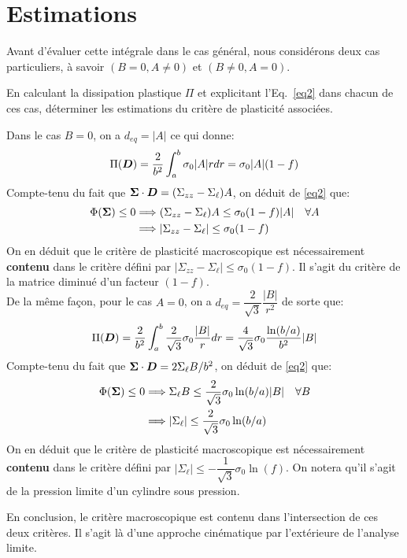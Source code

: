 \documentclass[french,12pt]{exam}
\begin{document}
\section{Estimations}
Avant d'évaluer cette intégrale dans le cas général, nous considérons deux cas particuliers, à savoir $(B = 0, A \neq 0)$ et  $(B \neq 0, A = 0)$.\\

\begin{questions}
\question En calculant la dissipation plastique $\Pi$ et explicitant l'Eq.~\ref{eq2} dans chacun de ces cas, déterminer les estimations du critère de plasticité associées.
\begin{solution}
Dans le cas $B=0$, on a $d_{eq}=|A|$ ce qui donne:
$$ \Pi(\boldsymbol{D}) = \frac{2}{b^2} \int_a^b \sigma_0 |A| rdr = \sigma_0 |A|(1-f)$$
Compte-tenu du fait que $\boldsymbol{\Sigma} \cdot \boldsymbol{D} = (\Sigma_{zz}-\Sigma_\ell)A$, on déduit de \eqref{eq2} que:
\begin{align*}
\Phi(\boldsymbol{\Sigma}) \leq 0 &\Longrightarrow (\Sigma_{zz}-\Sigma_\ell)A \leq \sigma_0 (1-f)|A| \quad \forall A\\
&\Longrightarrow |\Sigma_{zz}-\Sigma_\ell| \leq \sigma_0(1-f)
\end{align*}
On en déduit que le critère de plasticité macroscopique est nécessairement \textbf{contenu} dans le critère défini par $|\Sigma_{zz}-\Sigma_\ell| \leq \sigma_0(1-f)$. Il s'agit du critère de la matrice diminué d'un facteur $(1-f)$.\\

De la même façon, pour le cas $A=0$, on a $d_{eq} = \dfrac{2}{\sqrt{3}}\dfrac{|B|}{r^2}$ de sorte que:
$$ \Pi(\boldsymbol{D}) = \frac{2}{b^2} \int_a^b  \dfrac{2}{\sqrt{3}}\sigma_0 \dfrac{|B|}{r} dr = \dfrac{4}{\sqrt{3}}\sigma_0 \dfrac{\ln(b/a)}{b^2}|B|$$
Compte-tenu du fait que $\boldsymbol{\Sigma} \cdot \boldsymbol{D} = 2\Sigma_\ell B/b^2$, on déduit de \eqref{eq2} que:
\begin{align*}
\Phi(\boldsymbol{\Sigma}) \leq 0 &\Longrightarrow \Sigma_\ell B \leq \dfrac{2}{\sqrt{3}}\sigma_0 \ln(b/a)|B| \quad \forall B\\
&\Longrightarrow |\Sigma_\ell| \leq \dfrac{2}{\sqrt{3}}\sigma_0 \ln(b/a)
\end{align*}
On en déduit que le critère de plasticité macroscopique est nécessairement \textbf{contenu} dans le critère défini par $|\Sigma_\ell| \leq -\dfrac{1}{\sqrt{3}}\sigma_0 \ln(f)$. On notera qu'il s'agit de la pression limite d'un cylindre sous pression.

En conclusion, le critère macroscopique est contenu dans l'intersection de ces deux critères. Il s'agit là d'une approche cinématique par l'extérieure de l'analyse limite.
\end{solution}


\end{questions}
\end{document}
